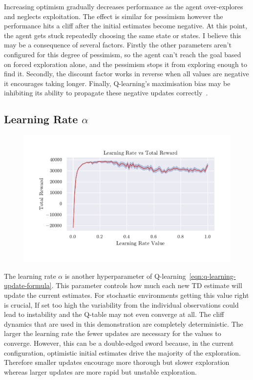 \documentclass[]{final_report}
\begin{document}
Increasing optimism gradually decreases performance as the agent over-explores and neglects exploitation. The effect is similar for pessimism however the performance hits a cliff after the initial estimates become negative. At this point, the agent gets stuck repeatedly choosing the same state or states. I believe this may be a consequence of several factors. Firstly the other parameters aren't configured for this degree of pessimism, so the agent can't reach the goal based on forced exploration alone, and the pessimism stops it from exploring enough to find it. Secondly, the discount factor works in reverse when all values are negative it encourages taking longer. Finally, Q-learning's maximisation bias may be inhibiting its ability to propagate these negative updates correctly~\cite{doubleQLearning, sutton2018reinforcement}. 


\subsection{Learning Rate \texorpdfstring{$\alpha$}{Lg}}

\begin{figure}[H]
  \centering
  
  \includegraphics[trim={0 1cm 0 1cm},clip,width=\textwidth]{hyper-paramiters/learning-rate}
  
  \caption{\label{fig:learning-rate}}
\end{figure}

The learning rate $\alpha$ is another hyperparameter of Q-learning~\ref{eqn:q-learning-update-formula}. This parameter controls how much each new TD estimate will update the current estimates. For stochastic environments getting this value right is crucial, If set too high the variability from the individual observations could lead to instability and the Q-table may not even converge at all. The cliff dynamics that are used in this demonstration are completely deterministic. 
The larger the learning rate the fewer updates are necessary for the values to converge. However, this can be a double-edged sword because, in the current configuration, optimistic initial estimates drive the majority of the exploration. Therefore smaller updates encourage more thorough but slower exploration whereas larger updates are more rapid but unstable exploration.
\end{document}
